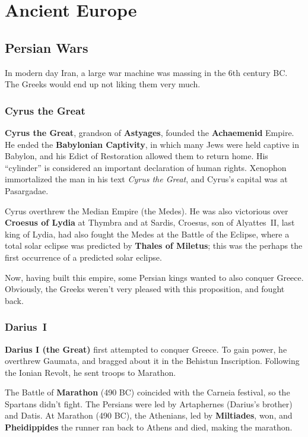 \chapter{Ancient Europe}

\section{Persian Wars}

In modern day Iran, a large war machine was massing in the 6th century BC\@.
The Greeks would end up not liking them very much.

\subsection*{Cyrus the Great}

\textbf{Cyrus the Great}, grandson of \textbf{Astyages}, founded the \textbf{Achaemenid} Empire.
He ended the \textbf{Babylonian Captivity}, in which many Jews were held captive in Babylon,
and his Edict of Restoration allowed them to return home.
His ``cylinder'' is considered an important declaration of human rights.
Xenophon immortalized the man in his text \textit{Cyrus the Great}, and Cyrus's capital was at Pasargadae.

Cyrus overthrew the Median Empire (the Medes).
He was also victorious over \textbf{Croesus of Lydia} at Thymbra and at Sardis,
Croesus, son of Alyattes~II, last king of Lydia, had also fought the Medes at the Battle of the Eclipse,
where a total solar eclipse was predicted by \textbf{Thales of Miletus};
this was the perhaps the first occurrence of a predicted solar eclipse.

Now, having built this empire, some Persian kings wanted to also conquer Greece.
Obviously, the Greeks weren't very pleased with this proposition, and fought back.

\subsection*{Darius~I}

\textbf{Darius I (the Great)} first attempted to conquer Greece.
To gain power, he overthrew Gaumata, and bragged about it in the Behistun Inscription.
Following the Ionian Revolt, he sent troops to Marathon.

The Battle of \textbf{Marathon} (490 BC) coincided with the Carneia festival, so the Spartans didn't fight.
The Persians were led by Artaphernes (Darius's brother) and Datis.
At Marathon (490 BC), the Athenians, led by \textbf{Miltiades}, won,
and \textbf{Pheidippides} the runner ran back to Athens and died, making the marathon.

